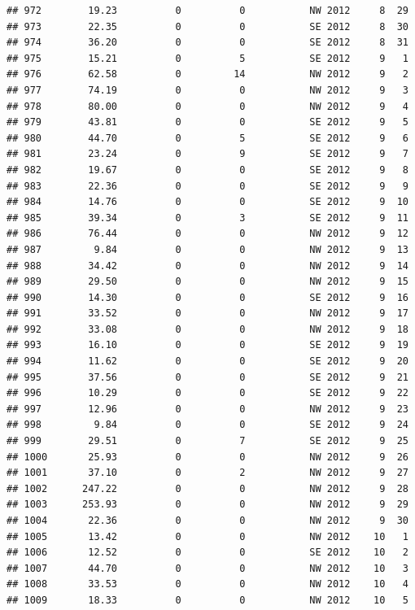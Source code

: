 \documentclass[
]{article}
\begin{document}
\begin{verbatim}
## 972        19.23          0          0           NW 2012     8  29
## 973        22.35          0          0           SE 2012     8  30
## 974        36.20          0          0           SE 2012     8  31
## 975        15.21          0          5           SE 2012     9   1
## 976        62.58          0         14           NW 2012     9   2
## 977        74.19          0          0           NW 2012     9   3
## 978        80.00          0          0           NW 2012     9   4
## 979        43.81          0          0           SE 2012     9   5
## 980        44.70          0          5           SE 2012     9   6
## 981        23.24          0          9           SE 2012     9   7
## 982        19.67          0          0           SE 2012     9   8
## 983        22.36          0          0           SE 2012     9   9
## 984        14.76          0          0           SE 2012     9  10
## 985        39.34          0          3           SE 2012     9  11
## 986        76.44          0          0           NW 2012     9  12
## 987         9.84          0          0           NW 2012     9  13
## 988        34.42          0          0           NW 2012     9  14
## 989        29.50          0          0           NW 2012     9  15
## 990        14.30          0          0           SE 2012     9  16
## 991        33.52          0          0           NW 2012     9  17
## 992        33.08          0          0           NW 2012     9  18
## 993        16.10          0          0           SE 2012     9  19
## 994        11.62          0          0           SE 2012     9  20
## 995        37.56          0          0           SE 2012     9  21
## 996        10.29          0          0           SE 2012     9  22
## 997        12.96          0          0           NW 2012     9  23
## 998         9.84          0          0           SE 2012     9  24
## 999        29.51          0          7           SE 2012     9  25
## 1000       25.93          0          0           NW 2012     9  26
## 1001       37.10          0          2           NW 2012     9  27
## 1002      247.22          0          0           NW 2012     9  28
## 1003      253.93          0          0           NW 2012     9  29
## 1004       22.36          0          0           NW 2012     9  30
## 1005       13.42          0          0           NW 2012    10   1
## 1006       12.52          0          0           SE 2012    10   2
## 1007       44.70          0          0           NW 2012    10   3
## 1008       33.53          0          0           NW 2012    10   4
## 1009       18.33          0          0           NW 2012    10   5

\end{verbatim}
\end{document}
